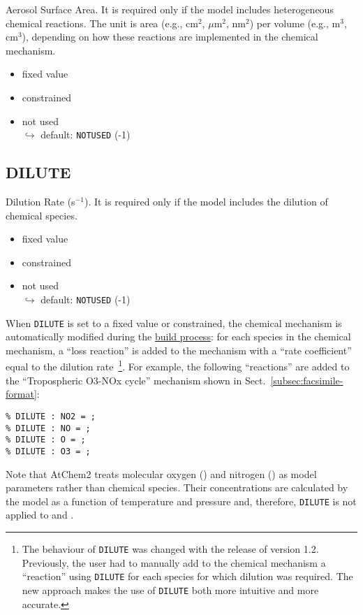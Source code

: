 Aerosol Surface Area. It is required only if the model includes
heterogeneous chemical reactions. The unit is area (e.g., cm$^2$,
$\mu$m$^2$, nm$^2$) per volume (e.g., m$^3$, cm$^3$), depending on how
these reactions are implemented in the chemical mechanism.

\begin{itemize}
\item fixed value
\item constrained
\item not used\\$\hookrightarrow$ default: \texttt{NOTUSED} (-1)
\end{itemize}

\subsection{DILUTE} \label{subsec:dilute}

Dilution Rate (s$^{-1}$). It is required only if the model includes
the dilution of chemical species.

\begin{itemize}
\item fixed value
\item constrained
\item not used\\$\hookrightarrow$ default: \texttt{NOTUSED} (-1)
\end{itemize}

When \texttt{DILUTE} is set to a fixed value or constrained, the
chemical mechanism is automatically modified during the
\hyperref[subsec:build-process]{build process}: for each species in
the chemical mechanism, a ``loss reaction'' is added to the mechanism
with a ``rate coefficient'' equal to the dilution rate~\footnote{The
  behaviour of \texttt{DILUTE} was changed with the release of version
  1.2. Previously, the user had to manually add to the chemical
  mechanism a ``reaction'' using \texttt{DILUTE} for each species for
  which dilution was required. The new approach makes the use of
  \texttt{DILUTE} both more intuitive and more accurate.}. For
example, the following ``reactions'' are added to the ``Tropospheric
O3-NOx cycle'' mechanism shown in Sect.~\ref{subsec:facsimile-format}:

\begin{verbatim}
% DILUTE : NO2 = ;
% DILUTE : NO = ;
% DILUTE : O = ;
% DILUTE : O3 = ;
\end{verbatim}

Note that AtChem2 treats molecular oxygen () and nitrogen
() as model parameters rather than chemical species. Their
concentrations are calculated by the model as a function of
temperature and pressure and, therefore, \texttt{DILUTE} is not
applied to  and .

